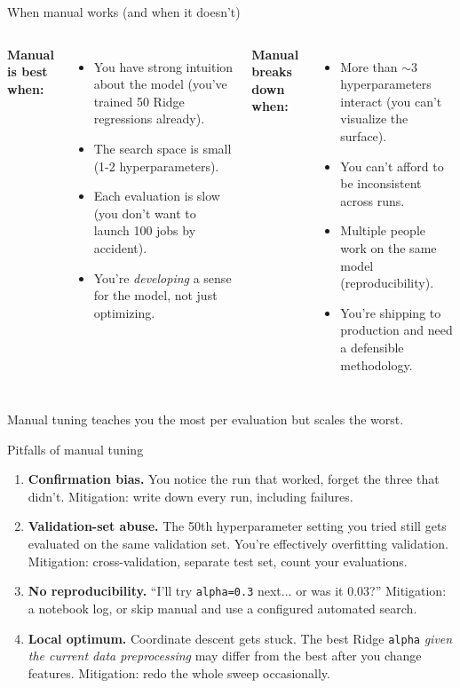 \documentclass[aspectratio=169]{beamer}
\begin{document}
\begin{frame}{When manual works (and when it doesn't)}
  \begin{columns}[T]
    \textbf{Manual is best when:}
    \begin{itemize}\small
      \item You have strong intuition about the model (you've trained 50 Ridge regressions already).
      \item The search space is small (1-2 hyperparameters).
      \item Each evaluation is slow (you don't want to launch 100 jobs by accident).
      \item You're \emph{developing} a sense for the model, not just optimizing.
    \end{itemize}
    \textbf{Manual breaks down when:}
    \begin{itemize}\small
      \item More than $\sim 3$ hyperparameters interact (you can't visualize the surface).
      \item You can't afford to be inconsistent across runs.
      \item Multiple people work on the same model (reproducibility).
      \item You're shipping to production and need a defensible methodology.
    \end{itemize}
  \end{columns}
  \vfill
  Manual tuning teaches you the most per evaluation but scales the worst.
\end{frame}

\begin{frame}{Pitfalls of manual tuning}
  \begin{enumerate}
    \item \textbf{Confirmation bias.} You notice the run that worked, forget the three that didn't. Mitigation: write down every run, including failures.
    \item \textbf{Validation-set abuse.} The 50th hyperparameter setting you tried still gets evaluated on the same validation set. You're effectively overfitting validation. Mitigation: cross-validation, separate test set, count your evaluations.
    \item \textbf{No reproducibility.} ``I'll try \texttt{alpha=0.3} next... or was it 0.03?'' Mitigation: a notebook log, or skip manual and use a configured automated search.
    \item \textbf{Local optimum.} Coordinate descent gets stuck. The best Ridge \texttt{alpha} \emph{given the current data preprocessing} may differ from the best after you change features. Mitigation: redo the whole sweep occasionally.
  \end{enumerate}
\end{frame}
\end{document}

